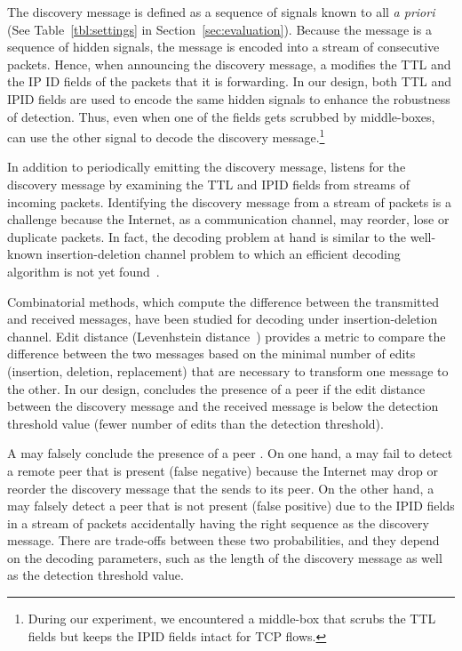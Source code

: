 The discovery message is defined as a sequence of signals known to all \names
\textit{a priori} (See Table~\ref{tbl:settings} in
Section~\ref{sec:evaluation}). Because the message is a sequence of hidden
signals, the message is encoded into a stream of consecutive packets. Hence,
when announcing the discovery message, a \name modifies the TTL and the IP ID
fields of the packets that it is forwarding. In our design, both TTL and IPID
fields are used to encode the same hidden signals to enhance the robustness of
\name detection. Thus, even when one of the fields gets scrubbed by
middle-boxes, \names can use the other signal to decode the discovery
message.\footnote{During our experiment, we encountered a middle-box that
scrubs the TTL fields but keeps the IPID fields intact for TCP flows.}

In addition to periodically emitting the discovery message, \name listens for
the discovery message by examining the TTL and IPID fields from streams of
incoming packets. Identifying the discovery message from a stream of packets is
a challenge because the Internet, as a communication channel, may reorder, lose
or duplicate packets. In fact, the decoding problem at hand is similar to the
well-known insertion-deletion channel problem to which an efficient decoding
algorithm is not yet found~\cite{deletion2008}.

Combinatorial methods, which compute the difference between the transmitted and
received messages, have been studied for decoding under insertion-deletion
channel. Edit distance (\ie Levenhstein distance~\cite{Levenshtein}) provides a
metric to compare the difference between the two messages based on the minimal
number of edits (insertion, deletion, replacement) that are necessary to
transform one message to the other. In our design, \name concludes the presence
of a peer if the edit distance between the discovery message and the received
message is below the detection threshold value (\ie fewer number of edits than
the detection threshold).

A \name may falsely conclude the presence of a peer \name. On one hand, a \name
may fail to detect a remote peer that is present (\ie false negative) because
the Internet may drop or reorder the discovery message that the \name sends to
its peer. On the other hand, a \name may falsely detect a peer that is not
present (\ie false positive) due to the IPID fields in a stream of packets
accidentally having the right sequence as the discovery message. There are
trade-offs between these two probabilities, and they depend on the decoding
parameters, such as the length of the discovery message as well as the
detection threshold value.

